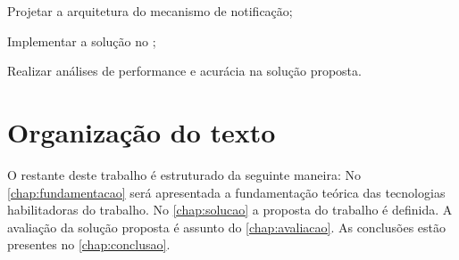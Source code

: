 \begin{alineas}

	\item Projetar a arquitetura do mecanismo de notificação;

	\item Implementar a solução no \middleware \mhubcddl;

	\item Realizar análises de performance e acurácia na solução proposta.

\end{alineas}


\section{Organização do texto}

O restante deste trabalho é estruturado da seguinte maneira: No \autoref{chap:fundamentacao} será apresentada a fundamentação teórica das tecnologias habilitadoras do trabalho. No \autoref{chap:solucao} a proposta do trabalho é definida. A avaliação da solução proposta é assunto do \autoref{chap:avaliacao}. As conclusões estão presentes no \autoref{chap:conclusao}.

